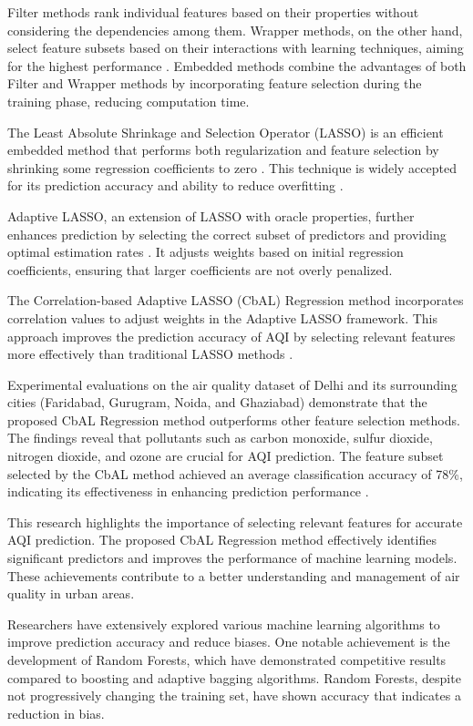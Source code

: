 \documentclass{book}
\numberwithin{equation}{section}
\numberwithin{figure}{section}
\begin{document}
Filter methods rank individual features based on their properties without considering the dependencies among them. Wrapper methods, on the other hand, select feature subsets based on their interactions with learning techniques, aiming for the highest performance \citep{Wang2016}. Embedded methods combine the advantages of both Filter and Wrapper methods by incorporating feature selection during the training phase, reducing computation time.

The Least Absolute Shrinkage and Selection Operator (LASSO) is an efficient embedded method that performs both regularization and feature selection by shrinking some regression coefficients to zero \citep{Tibshirani1996}. This technique is widely accepted for its prediction accuracy and ability to reduce overfitting \citep{Melkumova2017}.

Adaptive LASSO, an extension of LASSO with oracle properties, further enhances prediction by selecting the correct subset of predictors and providing optimal estimation rates \citep{Qian2013}. It adjusts weights based on initial regression coefficients, ensuring that larger coefficients are not overly penalized.

The Correlation-based Adaptive LASSO (CbAL) Regression method incorporates correlation values to adjust weights in the Adaptive LASSO framework. This approach improves the prediction accuracy of AQI by selecting relevant features more effectively than traditional LASSO methods \citep{Sethi2021}.

Experimental evaluations on the air quality dataset of Delhi and its surrounding cities (Faridabad, Gurugram, Noida, and Ghaziabad) demonstrate that the proposed CbAL Regression method outperforms other feature selection methods. The findings reveal that pollutants such as carbon monoxide, sulfur dioxide, nitrogen dioxide, and ozone are crucial for AQI prediction. The feature subset selected by the CbAL method achieved an average classification accuracy of 78\%, indicating its effectiveness in enhancing prediction performance \citep{Sethi2021}.

This research highlights the importance of selecting relevant features for accurate AQI prediction. The proposed CbAL Regression method effectively identifies significant predictors and improves the performance of machine learning models. These achievements contribute to a better understanding and management of air quality in urban areas.

Researchers have extensively explored various machine learning algorithms to improve prediction accuracy and reduce biases. One notable achievement is the development of Random Forests, which have demonstrated competitive results compared to boosting and adaptive bagging algorithms. Random Forests, despite not progressively changing the training set, have shown accuracy that indicates a reduction in bias.
\end{document}
